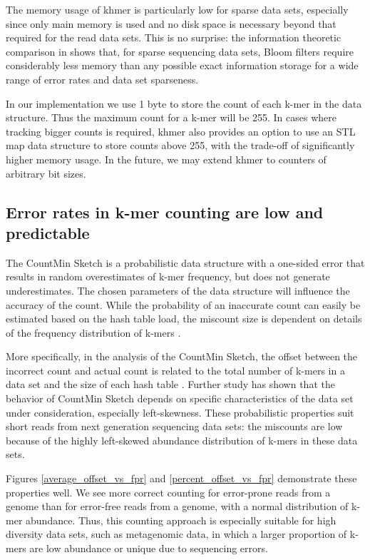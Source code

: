 \documentclass{article}
\begin{document}
The memory usage of khmer is particularly low for sparse data sets,
especially since only main memory is used and no disk space is
necessary beyond that required for the read data sets.  This is no
surprise: the information theoretic comparison in
\cite{Pell2012} shows that, for sparse sequencing data sets, Bloom
filters require considerably less memory than any possible exact
information storage for a wide range of error rates and data set
sparseness.

In our implementation we use 1 byte to store the count of each k-mer
in the data structure. Thus the maximum count for a k-mer will be 255.
In cases where tracking bigger counts is required, khmer also provides
an option to use an STL map data structure to store counts above 255,
with the trade-off of significantly higher memory usage.  In the
future, we may extend khmer to counters of arbitrary bit sizes.


\subsection{Error rates in k-mer counting are low and predictable}

The CountMin Sketch is a probabilistic data structure with a
one-sided error that results in random overestimates of k-mer
frequency, but does not generate underestimates. The chosen parameters
of the data structure will influence the accuracy of the count.  While
the probability of an inaccurate count can easily be estimated based
on the hash table load, the miscount size is dependent on details of
the frequency distribution of k-mers \cite{Cormode2005}.

More specifically, in the analysis of the CountMin
Sketch, the offset between the incorrect count and
actual count is related to the total number of k-mers in a data set and
the size of each hash table \cite{Cormode2005}. Further study has shown that the behavior
of CountMin Sketch depends on specific characteristics of the data
set under consideration, especially left-skewness\cite{Rusu2008,
  CormodeM05}.  These probabilistic properties suit short reads
from next generation sequencing data sets: the miscounts are
low because of the
highly left-skewed abundance distribution of k-mers in these data sets.

Figures \ref{average_offset_vs_fpr} and \ref{percent_offset_vs_fpr}
demonstrate these properties well.  We see more correct
counting for error-prone reads from a genome than for error-free
reads from a genome, with a normal
distribution of k-mer abundance.  Thus, this counting approach is
especially suitable for high diversity data sets, such as metagenomic
data, in which a larger proportion of k-mers are low abundance or
unique due to sequencing errors.
\end{document}
